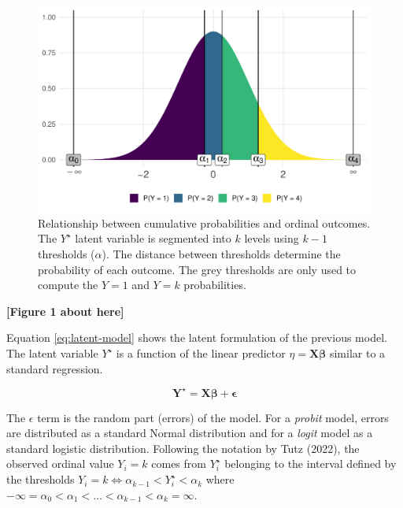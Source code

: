 \documentclass[
  man,floatsintext]{apa6}
\begin{document}
\begin{figure}

{\centering \includegraphics[width=1\linewidth]{paper_files/figure-latex/fig-explain-cumulative-1} 

}

\caption{Relationship between cumulative probabilities and ordinal outcomes. The \(Y^\star\) latent variable is segmented into \(k\) levels using \(k - 1\) thresholds (\(\alpha\)). The distance between thresholds determine the probability of each outcome. The grey thresholds are only used to compute the \(Y = 1\) and \(Y = k\) probabilities.}\label{fig:fig-explain-cumulative}
\end{figure}

\begin{center}\textbf{[Figure 1 about here]} \end{center}

\normalsize

Equation \eqref{eq:latent-model} shows the latent formulation of the previous model. The latent variable \(Y^\star\) is a function of the linear predictor \(\eta = \mathbf{X} \boldsymbol{\beta}\) similar to a standard regression.

\begin{equation}
\mathbf{Y^\star} = \mathbf{X}\boldsymbol{\beta} + \boldsymbol{\epsilon}
\label{eq:latent-model}
\end{equation}

The \(\epsilon\) term is the random part (errors) of the model. For a \emph{probit} model, errors are distributed as a standard Normal distribution and for a \emph{logit} model as a standard logistic distribution. Following the notation by Tutz (2022), the observed ordinal value \(Y_i = k\) comes from \(Y^\star_i\) belonging to the interval defined by the thresholds \(Y_i = k \iff \alpha_{k - 1} < Y^\star_i < \alpha_{k}\) where \(- \infty = \alpha_0 < \alpha_1 < \dots< \alpha_{k - 1} < \alpha_k = \infty\).
\end{document}
